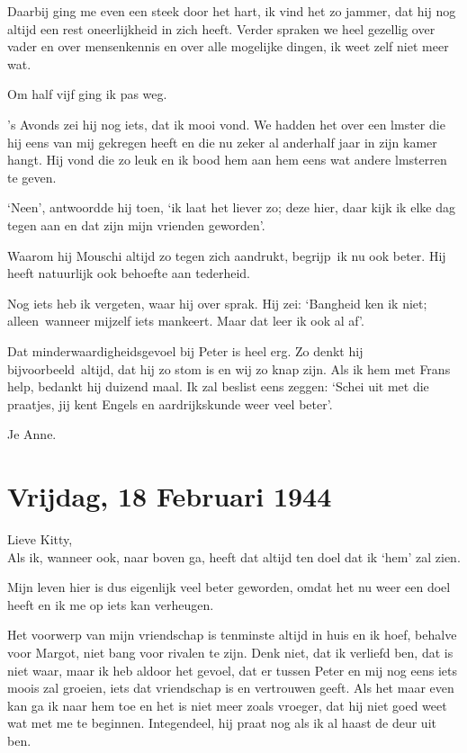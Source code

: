 \documentclass{book}
\begin{document}
Daarbij ging me even een steek door het hart, ik vind het zo jammer, dat
hij nog altijd een rest oneerlijkheid in zich heeft. Verder spraken we
heel gezellig over vader en over mensenkennis en over alle mogelijke
dingen, ik weet zelf niet meer wat.

Om half vijf ging ik pas weg.

's Avonds zei hij nog iets, dat ik mooi vond. We hadden het over een
lmster die hij eens van mij gekregen heeft en die nu zeker al anderhalf
jaar in zijn kamer hangt. Hij vond die zo leuk en ik bood hem aan hem
eens wat andere lmsterren te geven.

`Neen', antwoordde hij toen, `ik laat het liever zo; deze hier, daar
kijk ik elke dag tegen aan en dat zijn mijn vrienden geworden'.

Waarom hij Mouschi altijd zo tegen zich aandrukt, begrijp~ik nu ook
beter. Hij heeft natuurlijk ook behoefte aan tederheid.

Nog iets heb ik vergeten, waar hij over sprak. Hij zei: `Bangheid ken ik
niet; alleen~wanneer mijzelf iets mankeert. Maar dat leer ik ook al af'.

Dat minderwaardigheidsgevoel bij Peter is heel erg. Zo denkt hij
bijvoorbeeld~altijd, dat hij zo stom is en wij zo knap zijn. Als ik hem
met Frans help, bedankt hij duizend maal. Ik zal beslist eens zeggen:
`Schei uit met die praatjes, jij kent Engels en aardrijkskunde weer veel
beter'.

Je Anne.

\chapter{Vrijdag, 18 Februari 1944}

Lieve Kitty,\\Als ik, wanneer ook, naar boven ga, heeft dat altijd ten
doel dat ik `hem' zal zien.

Mijn leven hier is dus eigenlijk veel beter geworden, omdat het nu weer
een doel heeft en ik me op iets kan verheugen.

Het voorwerp van mijn vriendschap is tenminste altijd in huis en ik
hoef, behalve voor Margot, niet bang voor rivalen te zijn. Denk niet,
dat ik verliefd ben, dat is niet waar, maar ik heb aldoor het gevoel,
dat er tussen Peter en mij nog eens iets moois zal groeien, iets dat
vriendschap is en vertrouwen geeft. Als het maar even kan ga ik naar hem
toe en het is niet meer zoals vroeger, dat hij niet goed weet wat met me
te beginnen. Integendeel, hij praat nog als ik al haast de deur uit ben.
\end{document}
